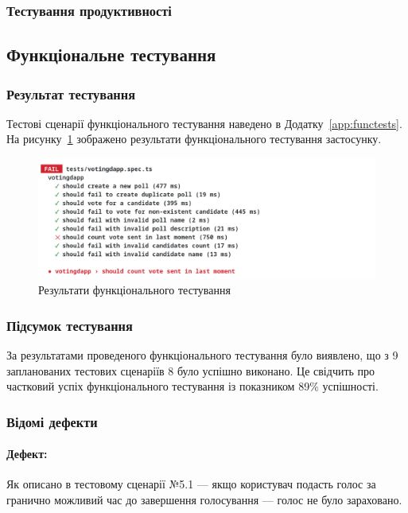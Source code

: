 \documentclass[14pt]{extreport}
\begin{document}
  \subsubsection{Тестування продуктивності}
  
  
  \subsection{Функціональне тестування}
  
  \subsubsection*{Результат тестування}
  
  Тестові сценарії функціонального тестування наведено в Додатку~\ref{app:functests}. На рисунку~\ref{fig:functests} зображено результати функціонального тестування застосунку.

  \begin{figure}[H]
    \centering
    \includegraphics[width=\textwidth]{FuncTests}
    \caption{Результати функціонального тестування}
    \label{fig:functests}
  \end{figure}
  
  \subsubsection*{Підсумок тестування}
  
  За результатами проведеного функціонального тестування було виявлено, що з 9 запланованих тестових сценаріїв 8 було успішно виконано. Це свідчить про частковий успіх функціонального тестування із показником 89\% успішності.
  
  \subsubsection*{Відомі дефекти}

  \paragraph{Дефект:} Як описано в тестовому сценарії №5.1 --- якщо користувач подасть голос за гранично можливий час до завершення голосування --- голос не було зараховано.
\end{document}
